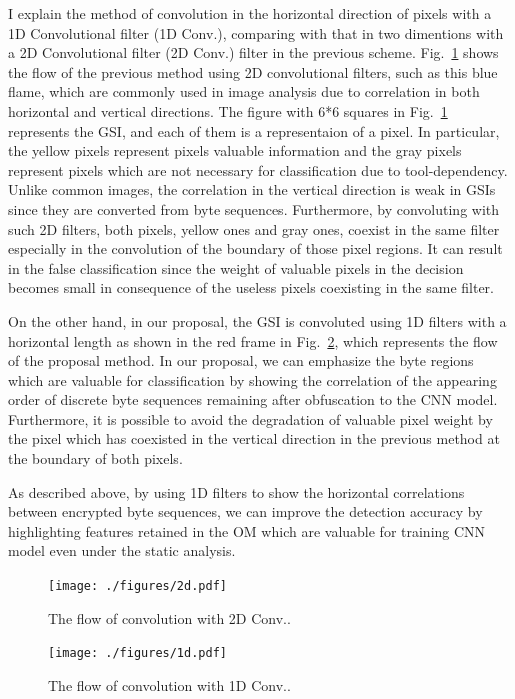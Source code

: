 \documentclass{ieeeaccess}
\newcommand{\myfigurename}{Fig.}
\begin{document}
I explain the method of convolution in the horizontal direction of pixels with a 1D Convolutional filter (1D Conv.), comparing with that in two dimentions with a 2D Convolutional filter (2D Conv.) filter in the previous scheme.
\myfigurename~\ref{fig:2d} shows the flow of the previous method using 2D convolutional filters, such as this blue flame, which are commonly used in image analysis due to correlation in both horizontal and vertical directions.
The figure with 6*6 squares in \myfigurename~\ref{fig:2d} represents the GSI, and each of them is a representaion of a pixel.
In particular, the yellow pixels represent pixels valuable information and the gray pixels represent pixels which are not necessary for classification due to tool-dependency.
Unlike common images, the correlation in the vertical direction is weak in GSIs since they are converted from byte sequences.
Furthermore, by convoluting with such 2D filters, both pixels, yellow ones and gray ones, coexist in the same filter especially in the convolution of the boundary of those pixel regions.
It can result in the false classification since the weight of valuable pixels in the decision becomes small in consequence of the useless pixels coexisting in the same filter.

On the other hand, in our proposal, the GSI is convoluted using 1D filters with a horizontal length as shown in the red frame in \myfigurename~\ref{fig:1d}, which represents the flow of the proposal method.
In our proposal, we can emphasize the byte regions which are valuable for classification by showing the correlation of the appearing order of discrete byte sequences remaining after obfuscation to the CNN model.
Furthermore, it is possible to avoid the degradation of valuable pixel weight by the pixel which has coexisted in the vertical direction in the previous method at the boundary of both pixels.

As described above, by using 1D filters to show the horizontal correlations between encrypted byte sequences, we can improve the detection accuracy by highlighting features retained in the OM which are valuable for training CNN model even under the static analysis.

\begin{figure}[t]
 \centering
 \texttt{[image: ./figures/2d.pdf]}
 \caption{The flow of convolution with 2D Conv..} 
 \label{fig:2d}
\end{figure}
\begin{figure}[t]
 \centering
 \texttt{[image: ./figures/1d.pdf]}
 \caption{The flow of convolution with 1D Conv..} 
 \label{fig:1d}
\end{figure}
\end{document}
